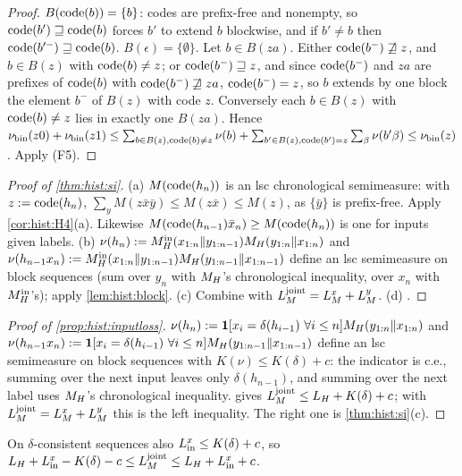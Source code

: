 \begin{proof}
$B(\operatorname{code}(b))=\{b\}$: codes are prefix-free and nonempty, so $\operatorname{code}(b')\sqsupseteq\operatorname{code}(b)$ forces $b'$ to extend $b$ blockwise, and if $b'\ne b$ then $\operatorname{code}(b'^-)\sqsupseteq\operatorname{code}(b)$. $B(\epsilon)=\{\emptyset\}$. Let $b\in B(za)$. Either $\operatorname{code}(b^-)\not\sqsupseteq z$, and $b\in B(z)$ with $\operatorname{code}(b)\ne z$; or $\operatorname{code}(b^-)\sqsupseteq z$, and since $\operatorname{code}(b^-)$ and $za$ are prefixes of $\operatorname{code}(b)$ with $\operatorname{code}(b^-)\not\sqsupseteq za$, $\operatorname{code}(b^-)=z$, so $b$ extends by one block the element $b^-$ of $B(z)$ with code $z$. Conversely each $b\in B(z)$ with $\operatorname{code}(b)\ne z$ lies in exactly one $B(za)$. Hence $\nu_{\rm bin}(z0)+\nu_{\rm bin}(z1)\le\sum_{b\in B(z),\operatorname{code}(b)\ne z}\nu(b)+\sum_{b'\in B(z),\operatorname{code}(b')=z}\sum_\beta\nu(b'\beta)\le\nu_{\rm bin}(z)$. Apply (F5).
\end{proof}

\begin{proof}[Proof of \cref{thm:hist:si}]
(a) $M(\operatorname{code}(h_n))$ is an lsc chronological semimeasure: with $z:=\operatorname{code}(h_n)$, $\sum_yM(z\bar x\bar y)\le M(z\bar x)\le M(z)$, as $\{\bar y\}$ is prefix-free. Apply \cref{cor:hist:H4}(a). Likewise $M(\operatorname{code}(h_{n-1})\bar x_n)\ge M(\operatorname{code}(h_n))$ is one for inputs given labels. (b) $\nu(h_n):=M_{H}^{\mathrm{in}}(x_{1:n}\Vert y_{1:n-1})M_{H}(y_{1:n}\Vert x_{1:n})$ and $\nu(h_{n-1}x_n):=M_{H}^{\mathrm{in}}(x_{1:n}\Vert y_{1:n-1})M_{H}(y_{1:n-1}\Vert x_{1:n-1})$ define an lsc semimeasure on block sequences (sum over $y_n$ with $M_{H}$'s chronological inequality, over $x_n$ with $M_{H}^{\mathrm{in}}$'s); apply \cref{lem:hist:block}. (c) Combine with $L_{M}^{\mathrm{joint}}=L_{M}^{x}+L_{M}^{y}$. (d) .
\end{proof}

\begin{proof}[Proof of \cref{prop:hist:inputloss}]
$\nu(h_n):=\mathbf{1}[x_i=\delta(h_{i-1})\ \forall i\le n]M_{H}(y_{1:n}\Vert x_{1:n})$ and $\nu(h_{n-1}x_n):=\mathbf{1}[x_i=\delta(h_{i-1})\ \forall i\le n]M_{H}(y_{1:n-1}\Vert x_{1:n-1})$ define an lsc semimeasure on block sequences with $K(\nu)\le K(\delta)+c$: the indicator is c.e., summing over the next input leaves only $\delta(h_{n-1})$, and summing over the next label uses $M_{H}$'s chronological inequality.  gives $L_{M}^{\mathrm{joint}}\le L_{H}+K(\delta)+c$; with $L_{M}^{\mathrm{joint}}=L_{M}^{x}+L_{M}^{y}$ this is the left inequality. The right one is \cref{thm:hist:si}(c).
\end{proof}

On $\delta$-consistent sequences also $L^x_{\rm in}\le K(\delta)+c$, so $L_{H}+L^x_{\rm in}-K(\delta)-c\le L_{M}^{\mathrm{joint}}\le L_{H}+L^x_{\rm in}+c$.

